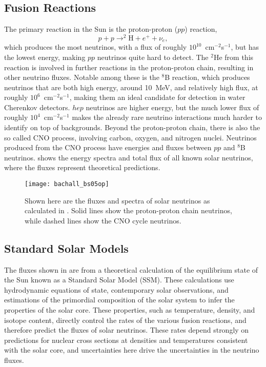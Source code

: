 \subsection{Fusion Reactions}

The primary reaction in the Sun is the proton-proton ($pp$) reaction,
\begin{equation}
p+p \rightarrow ^2\mathrm{H}+e^++\nu_e,
\end{equation}
which produces the most neutrinos, with a flux of roughly $10^{10}$~cm$^{-2}$s$^{-1}$, but has the lowest energy, making $pp$ neutrinos quite hard to detect.
The $^2$He from this reaction is involved in further reactions in the proton-proton chain, resulting in other neutrino fluxes.
Notable among these is the $^8$B reaction, which produces neutrinos that are both high energy, around 10~MeV, and relatively high flux, at roughly $10^6$~cm$^{-2}$s$^{-1}$, making them an ideal candidate for detection in water Cherenkov detectors.
$hep$ neutrinos are higher energy, but the much lower flux of roughly $10^4$~cm$^{-2}$s$^{-1}$ makes the already rare neutrino interactions much harder to identify on top of backgrounds.
Beyond the proton-proton chain, there is also the so called CNO process, involving carbon, oxygen, and nitrogen nuclei. 
Neutrinos produced from the CNO process have energies and fluxes between $pp$ and $^8$B neutrinos.
 shows the energy spectra and total flux of all known solar neutrinos, where the fluxes represent theoretical predictions.

\begin{figure}
\centering
\texttt{[image: bachall\_bs05op]}
\caption{\label{neutrino_spectra}Shown here are the fluxes and spectra of solar neutrinos as calculated in \cite{bs05op}.
    Solid lines show the proton-proton chain neutrinos, while dashed lines show the CNO cycle neutrinos.}
\end{figure}

\subsection{Standard Solar Models}

The fluxes shown in  are from a theoretical calculation of the equilibrium state of the Sun known as a Standard Solar Model (SSM).
These calculations use hydrodynamic equations of state, contemporary solar observations, and estimations of the primordial composition of the solar system to infer the properties of the solar core.
These properties, such as temperature, density, and isotope content, directly control the rates of the various fusion reactions, and therefore predict the fluxes of solar neutrinos.
These rates depend strongly on predictions for nuclear cross sections at densities and temperatures consistent with the solar core, and uncertainties here drive the uncertainties in the neutrino fluxes.

